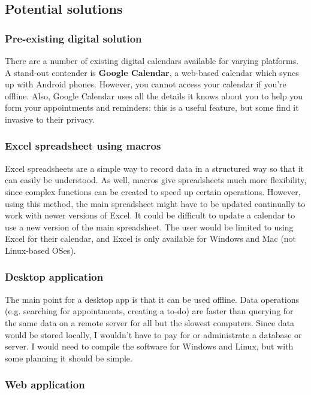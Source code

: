 \subsection{Potential solutions}
\subsubsection{Pre-existing digital solution}

There are a number of existing digital calendars available for varying
platforms. A stand-out contender is \textbf{Google Calendar}, a web-based
calendar which syncs up with Android phones. However, you cannot access your
calendar if you're offline. Also, Google Calendar uses all the details it knows
about you to help you form your appointments and reminders: this is a useful
feature, but some find it invasive to their privacy.


\subsubsection{Excel spreadsheet using macros}

Excel spreadsheets are a simple way to record data in a structured way so that
it can easily be understood. As well, macros give spreadsheets much more
flexibility, since complex functions can be created to speed up certain
operations. However, using this method, the main spreadsheet might have to be
updated continually to work with newer versions of Excel. It could be difficult
to update a calendar to use a new version of the main spreadsheet. The user
would be limited to using Excel for their calendar, and Excel is only available
for Windows and Mac (not Linux-based OSes).


\subsubsection{Desktop application}

The main point for a desktop app is that it can be used offline. Data operations
(e.g. searching for appointments, creating a to-do) are faster than querying for
the same data on a remote server for all but the slowest computers. Since data
would be stored locally, I wouldn't have to pay for or administrate a database
or server. I would need to compile the software for Windows and Linux, but with
some planning it should be simple.


\subsubsection{Web application}

